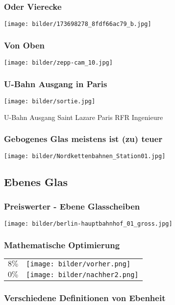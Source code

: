 \documentclass[12pt]{beamer}
\begin{document}
\begin{frame}
\frametitle{Oder Vierecke}
\begin{center}
\texttt{[image: bilder/173698278\_8fdf66ac79\_b.jpg]}
\end{center}
\end{frame}

\begin{frame}
\frametitle{Von Oben}
\begin{center}
\texttt{[image: bilder/zepp-cam\_10.jpg]}
\end{center}
\end{frame}

\begin{frame}
\frametitle{U-Bahn Ausgang in Paris}
\begin{center}
\texttt{[image: bilder/sortie.jpg]}
\end{center}
\tiny{U-Bahn Ausgang Saint Lazare Paris RFR Ingenieure}
\end{frame}

\begin{frame}
\frametitle{Gebogenes Glas meistens ist (zu) teuer}
\begin{center}
\texttt{[image: bilder/Nordkettenbahnen\_Station01.jpg]}
\end{center}
\end{frame}

\subsection{Ebenes Glas}

\begin{frame}
\frametitle{Preiswerter - Ebene Glasscheiben}
\texttt{[image: bilder/berlin-hauptbahnhof\_01\_gross.jpg]}
\end{frame}




\begin{frame}
\frametitle{Mathematische Optimierung}
\begin{center}
\begin{tabular}{rl}
$8 \%$ &
\texttt{[image: bilder/vorher.png]}\\
$0 \%$&
\texttt{[image: bilder/nachher2.png]}\\
\end{tabular}
\end{center}
\end{frame}

\begin{frame}
\frametitle{Verschiedene Definitionen von Ebenheit}
\begin{center}
\scalebox{0.6} {

}
\end{center}
\end{frame}
\end{document}
